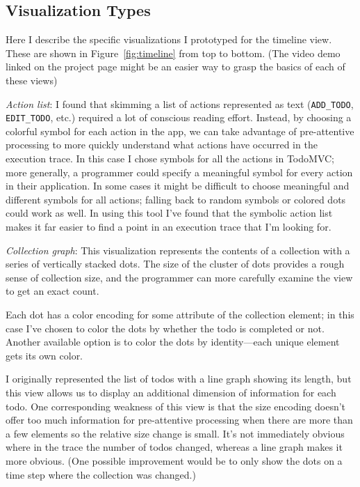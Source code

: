 \documentclass{sigchi}
\begin{document}
\hypertarget{visualization-types}{%
\subsection{Visualization Types}\label{visualization-types}}

Here I describe the specific visualizations I prototyped for the
timeline view. These are shown in Figure~\ref{fig:timeline} from top to
bottom. (The video demo linked on the project page might be an easier
way to grasp the basics of each of these views)

\emph{Action list}: I found that skimming a list of actions represented
as text (\texttt{ADD\_TODO}, \texttt{EDIT\_TODO}, etc.) required a lot
of conscious reading effort. Instead, by choosing a colorful symbol for
each action in the app, we can take advantage of pre-attentive
processing to more quickly understand what actions have occurred in the
execution trace. In this case I chose symbols for all the actions in
TodoMVC; more generally, a programmer could specify a meaningful symbol
for every action in their application. In some cases it might be
difficult to choose meaningful and different symbols for all actions;
falling back to random symbols or colored dots could work as well. In
using this tool I've found that the symbolic action list makes it far
easier to find a point in an execution trace that I'm looking for.

\emph{Collection graph}: This visualization represents the contents of a
collection with a series of vertically stacked dots. The size of the
cluster of dots provides a rough sense of collection size, and the
programmer can more carefully examine the view to get an exact count.

Each dot has a color encoding for some attribute of the collection
element; in this case I've chosen to color the dots by whether the todo
is completed or not. Another available option is to color the dots by
identity---each unique element gets its own color.

I originally represented the list of todos with a line graph showing its
length, but this view allows us to display an additional dimension of
information for each todo. One corresponding weakness of this view is
that the size encoding doesn't offer too much information for
pre-attentive processing when there are more than a few elements so the
relative size change is small. It's not immediately obvious where in the
trace the number of todos changed, whereas a line graph makes it more
obvious. (One possible improvement would be to only show the dots on a
time step where the collection was changed.)
\end{document}

